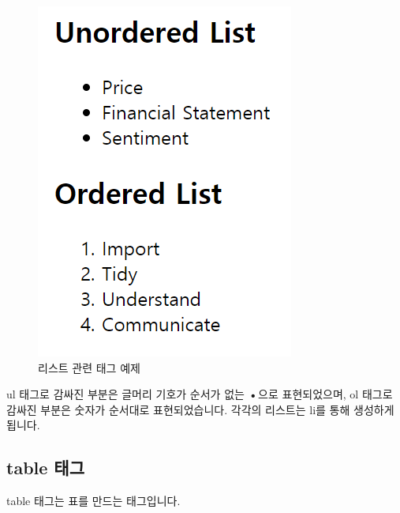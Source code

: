 \documentclass[]{book}
\begin{document}
\begin{figure}

{\centering \includegraphics[width=0.5\linewidth]{images/html_4} 

}

\caption{리스트 관련 태그 예제}\label{fig:unnamed-chunk-14}
\end{figure}

ul 태그로 감싸진 부분은 글머리 기호가 순서가 없는 \textbf{•}으로 표현되었으며, ol 태그로 감싸진 부분은 숫자가 순서대로 표현되었습니다. 각각의 리스트는 li를 통해 생성하게 됩니다.

\hypertarget{table-}{%
\subsection{table 태그}\label{table-}}

table 태그는 표를 만드는 태그입니다.
\end{document}
